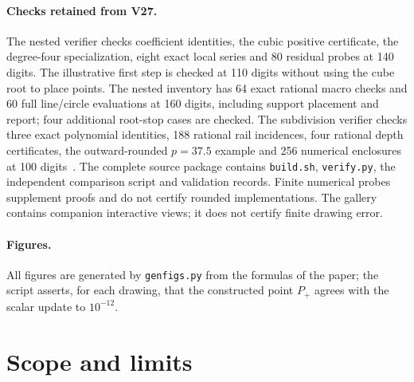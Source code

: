 \paragraph{Checks retained from V27.}
The nested verifier checks coefficient identities, the cubic positive certificate, the degree-four
specialization, eight exact local series and 80 residual probes at 140 digits. The illustrative first
step is checked at 110 digits without using the cube root to place points. The nested inventory has 64
exact rational macro checks and 60 full line/circle evaluations at 160 digits, including support
placement and report; four additional root-stop cases are checked. The subdivision verifier checks
three exact polynomial identities, 188 rational rail incidences, four rational depth certificates, the
outward-rounded $p=37.5$ example and 256 numerical enclosures at 100 digits~\cite{supplS}. The complete
source package contains \texttt{build.sh}, \texttt{verify.py}, the independent comparison script and
validation records. Finite numerical probes supplement proofs and do not certify rounded
implementations. The gallery contains companion interactive views; it does not certify finite drawing
error.

\paragraph{Figures.}
All figures are generated by \texttt{genfigs.py} from the formulas of the paper; the script asserts, for
each drawing, that the constructed point $P_+$ agrees with the scalar update to $10^{-12}$.

\section{Scope and limits}\label{sec:limits}

